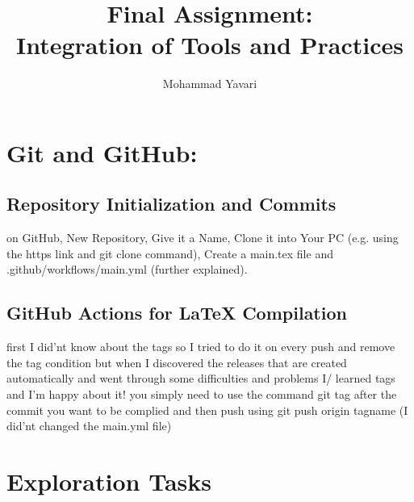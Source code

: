 \documentclass[titlepage]{article}
\title{Final Assignment:\\Integration of Tools and Practices}
\author{Mohammad Yavari}
\begin{document}
\maketitle
\tableofcontents
\pagebreak
\section{Git and GitHub:}
\subsection{Repository Initialization and Commits}
on GitHub, New Repository, Give it a Name, Clone it into Your PC (e.g. using the https link and git clone command), Create a main.tex file and .github/workflows/main.yml (further explained).
\subsection{ GitHub Actions for LaTeX Compilation}
first I did'nt know about the tags so I tried to do it on every push and remove the tag condition but when I discovered the releases that are created automatically and went through some difficulties and problems
I/ learned tags and I'm happy about it!\newline
you simply need to use the command git tag after the commit you want to be complied and then push using git push origin tagname\newline
(I did'nt changed the main.yml file) 
\section{Exploration Tasks}
\end{document}

